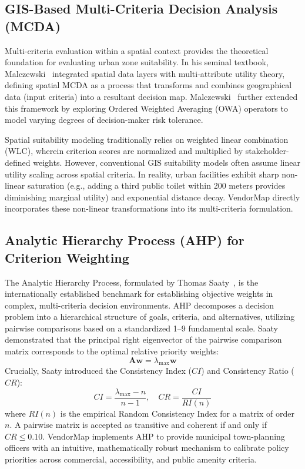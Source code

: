 \subsection{GIS-Based Multi-Criteria Decision Analysis (MCDA)}
Multi-criteria evaluation within a spatial context provides the theoretical foundation for evaluating urban zone suitability. In his seminal textbook, Malczewski~\cite{malczewski1999gis} integrated spatial data layers with multi-attribute utility theory, defining spatial MCDA as a process that transforms and combines geographical data (input criteria) into a resultant decision map. Malczewski~\cite{malczewski2006ordered} further extended this framework by exploring Ordered Weighted Averaging (OWA) operators to model varying degrees of decision-maker risk tolerance. 

Spatial suitability modeling traditionally relies on weighted linear combination (WLC), wherein criterion scores are normalized and multiplied by stakeholder-defined weights. However, conventional GIS suitability models often assume linear utility scaling across spatial criteria. In reality, urban facilities exhibit sharp non-linear saturation (e.g., adding a third public toilet within 200 meters provides diminishing marginal utility) and exponential distance decay. VendorMap directly incorporates these non-linear transformations into its multi-criteria formulation.

\subsection{Analytic Hierarchy Process (AHP) for Criterion Weighting}
The Analytic Hierarchy Process, formulated by Thomas Saaty~\cite{saaty1980analytic, saaty1990how}, is the internationally established benchmark for establishing objective weights in complex, multi-criteria decision environments. AHP decomposes a decision problem into a hierarchical structure of goals, criteria, and alternatives, utilizing pairwise comparisons based on a standardized 1--9 fundamental scale. Saaty demonstrated that the principal right eigenvector of the pairwise comparison matrix corresponds to the optimal relative priority weights:
\begin{equation}
    \mathbf{A} \mathbf{w} = \lambda_{\max} \mathbf{w}
    \label{eq:lit_ahp}
\end{equation}
Crucially, Saaty introduced the Consistency Index ($CI$) and Consistency Ratio ($CR$):
\begin{equation}
    CI = \frac{\lambda_{\max} - n}{n - 1}, \quad CR = \frac{CI}{RI(n)}
    \label{eq:lit_cr}
\end{equation}
where $RI(n)$ is the empirical Random Consistency Index for a matrix of order $n$. A pairwise matrix is accepted as transitive and coherent if and only if $CR \le 0.10$. VendorMap implements AHP to provide municipal town-planning officers with an intuitive, mathematically robust mechanism to calibrate policy priorities across commercial, accessibility, and public amenity criteria.

